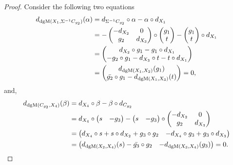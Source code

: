 \begin{proof}
    Consider the following two equations
    \begin{align*}
        d_{\operatorname{dgM}(X_1, \Sigma^{-1} C_{g_2})}(\alpha)
        &= d_{\Sigma^{-1} C_{g_2}} \circ \alpha - \alpha \circ d_{X_1} \\
        &= -
        \begin{pmatrix}
            - d_{X_2} & 0 \\
            g_2 & d_{X_3}
        \end{pmatrix}
        \circ
        \begin{pmatrix}
            g_1 \\
            t
        \end{pmatrix}
        -
        \begin{pmatrix}
            g_1 \\
            t
        \end{pmatrix}
        \circ
        d_{X_1} \\
        &=
        \begin{pmatrix}
            d_{X_2} \circ g_1 - g_1 \circ d_{X_1} \\
            - g_2 \circ g_1 - d_{X_3} \circ t - t \circ d_{X_1}
        \end{pmatrix} \\
        &=
        \begin{pmatrix}
            d_{\operatorname{dgM}(X_1, X_2)}(g_1) \\
            \bar{g_2} \circ g_1 - d_{\operatorname{dgM}(X_1, X_3)}(t)
        \end{pmatrix}
        =
        0,
    \end{align*}
    and,
    \begin{align*}
        d_{\operatorname{dgM}(C_{g_2}, X_4)}(\beta)
        &= d_{X_4} \circ \beta - \beta \circ d_{C_{g_2}} \\
        &= d_{X_4} \circ
        \begin{pmatrix}
            s & -g_3
        \end{pmatrix}
        -
        \begin{pmatrix}
            s & -g_3
        \end{pmatrix}
        \circ
        \begin{pmatrix}
            - d_{X_2} & 0 \\
            g_2 & d_{X_3}
        \end{pmatrix} \\
        &=
        \begin{pmatrix}
            d_{X_4} \circ s + s \circ d_{X_2} + g_3 \circ g_2 & - d_{X_4} \circ g_3 + g_3 \circ d_{X_3}
        \end{pmatrix} \\
        &=
        \begin{pmatrix}
            d_{\operatorname{dgM}(X_2, X_4)}(s) - \bar{g_3} \circ g_2 & -d_{\operatorname{dgM}(X_3, X_4)}(g_3)
        \end{pmatrix}
        = 0.
    \end{align*}
    

\end{proof}
